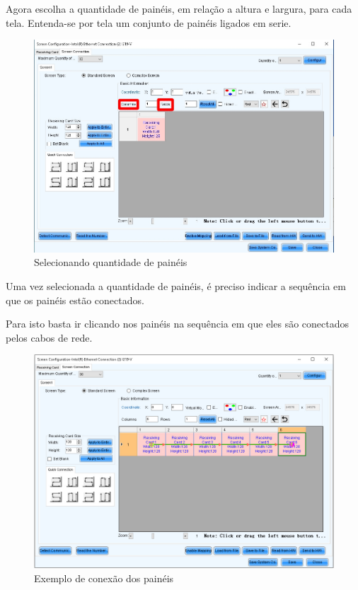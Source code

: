 \documentclass[12pt, a4paper]{article}
\begin{document}
\newpage

Agora escolha a quantidade de painéis, em relação a altura e largura, para cada tela. Entenda-se por tela um conjunto de painéis ligados em serie.

\begin{figure}[!htb]
	\centering
	\includegraphics[width=\textwidth]{qntPaineis.jpeg}
	\caption{\label{fig:qntPaineis.jpeg}Selecionando quantidade de painéis}
\end{figure}
\newpage

Uma vez selecionada a quantidade de painéis, é preciso indicar a sequência em que os painéis estão conectados.

Para isto basta ir clicando nos painéis na sequência em que eles são conectados pelos cabos de rede.

\begin{figure}[!htb]
	\centering
	\includegraphics[width=\textwidth]{conexao.jpeg}
	\caption{\label{fig:}Exemplo de conexão dos painéis}
\end{figure}
\end{document}
